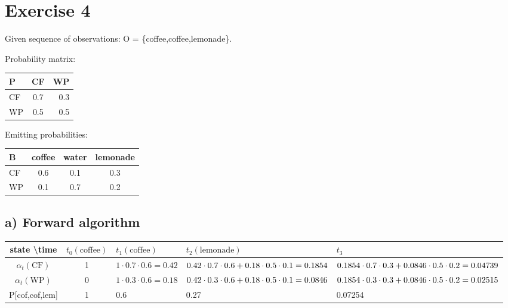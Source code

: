 \documentclass[a4paper]{article}
\newcommand{\WP}{\text{WP}}
\newcommand{\CF}{\text{CF}}
\begin{document}
\section*{Exercise 4}
Given sequence of observations: O = \{coffee,coffee,lemonade\}. 

\vspace{5mm}
\noindent Probability matrix:

\begin{tabular}{ l | c | r }
  P & CF & WP \\ \hline
  CF & 0.7 & 0.3 \\
  WP & 0.5 & 0.5 \\
\end{tabular}

\vspace{5mm}
\noindent Emitting probabilities:

\begin{tabular}{ l | c | c | c }
  B & coffee & water & lemonade \\ \hline
  CF & 0.6 & 0.1 & 0.3 \\
  WP & 0.1 & 0.7 & 0.2 \\
\end{tabular}
\subsection*{a) Forward algorithm}
\vspace{5mm}
\begin{tabular}{| c | c | p{3cm} | p{3cm} | p{3cm}|}
  \hline
  state \textbackslash time & $t_0(\text{coffee})$ & $t_1(\text{coffee})$ & $t_2(\text{lemonade})$ & $t_3$\\ \hline
  $\alpha_t(\CF)$ 	& 1 & $1 \cdot 0.7 \cdot 0.6 = 0.42$ 	& $0.42 \cdot 0.7 \cdot 0.6 \newline + 0.18 \cdot 0.5 \cdot 0.1 \newline = 0.1854$ & $0.1854 \cdot 0.7 \cdot 0.3 \newline + 0.0846 \cdot 0.5 \cdot 0.2 \newline = 0.04739$\\ \hline
  $\alpha_t(\WP)$ 	& 0 & $1 \cdot 0.3 \cdot 0.6 = 0.18$	& $0.42 \cdot 0.3 \cdot 0.6 \newline + 0.18 \cdot 0.5 \cdot 0.1 \newline = 0.0846$ & $0.1854 \cdot 0.3 \cdot 0.3 + 0.0846 \cdot 0.5 \cdot 0.2 \newline = 0.02515$ \\ \hline
  P[cof,cof,lem] & 1 & 0.6	& 0.27 & 0.07254 \\ \hline
\end{tabular}
\end{document}
